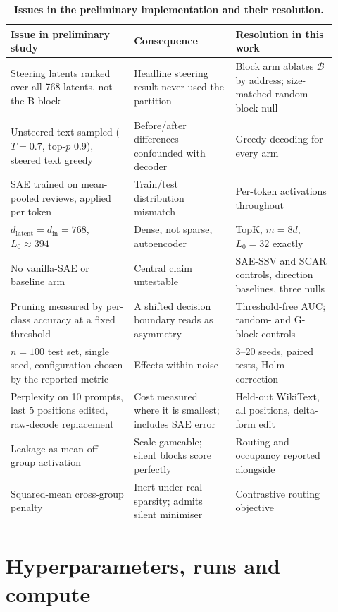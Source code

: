 \documentclass[11pt,a4paper]{article}
\theoremstyle{remark}
\newcommand{\Bset}{\mathcal{B}}
\begin{document}
\begin{table}[!htbp]
  \centering\small
  \caption{\textbf{Issues in the preliminary implementation and their resolution.}}
  \label{tab:audit}
  \begin{tabular}{@{}p{0.34\linewidth}p{0.29\linewidth}p{0.29\linewidth}@{}}
  \toprule
  Issue in preliminary study & Consequence & Resolution in this work \\
  \midrule
  Steering latents ranked over all 768 latents, not the B-block
    & Headline steering result never used the partition
    & Block arm ablates $\Bset$ by address; size-matched random-block null \\
  Unsteered text sampled ($T{=}0.7$, top-$p$ 0.9), steered text greedy
    & Before/after differences confounded with decoder
    & Greedy decoding for every arm \\
  SAE trained on mean-pooled reviews, applied per token
    & Train/test distribution mismatch
    & Per-token activations throughout \\
  $d_{\mathrm{latent}}=d_{\mathrm{in}}=768$, $L_0\approx394$
    & Dense, not sparse, autoencoder
    & TopK, $m=8d$, $L_0=32$ exactly \\
  No vanilla-SAE or baseline arm
    & Central claim untestable
    & SAE-SSV and SCAR controls, direction baselines, three nulls \\
  Pruning measured by per-class accuracy at a fixed threshold
    & A shifted decision boundary reads as asymmetry
    & Threshold-free AUC; random- and G-block controls \\
  $n=100$ test set, single seed, configuration chosen by the reported metric
    & Effects within noise
    & 3--20 seeds, paired tests, Holm correction \\
  Perplexity on 10 prompts, last 5 positions edited, raw-decode replacement
    & Cost measured where it is smallest; includes SAE error
    & Held-out WikiText, all positions, delta-form edit \\
  Leakage as mean off-group activation
    & Scale-gameable; silent blocks score perfectly
    & Routing and occupancy reported alongside \\
  Squared-mean cross-group penalty
    & Inert under real sparsity; admits silent minimiser
    & Contrastive routing objective \\
  \bottomrule
  \end{tabular}
\end{table}

\FloatBarrier
\section{Hyperparameters, runs and compute}
\label{app:hparams}
\end{document}

